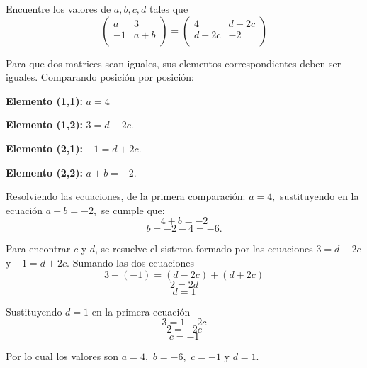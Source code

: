 \begin{prob} 
Encuentre los valores de $a,b,c,d$ tales que 
$$\left( \begin{array}{cc}
a&3\\
-1&a+b\\
\end{array} \right)=\left( \begin{array}{cc}
4&d-2c\\
d+2c&-2\\
\end{array} \right)$$

\begin{myproof}
Para que dos matrices sean iguales, sus elementos correspondientes deben ser iguales. Comparando posición por posición:

\textbf{Elemento (1,1):} $a = 4$

\textbf{Elemento (1,2):} $3 = d - 2c.$

\textbf{Elemento (2,1):} $-1 = d + 2c.$

\textbf{Elemento (2,2):} $a + b = -2.$

Resolviendo las ecuaciones, de la primera comparación: $a = 4,$ sustituyendo en la ecuación $a + b = -2,$ se cumple que:
$$4 + b = -2$$
$$b = -2 - 4 = -6.$$

Para encontrar $c$ y $d$, se resuelve el sistema formado por las ecuaciones $3 = d - 2c$ y $-1 = d + 2c.$ Sumando las dos ecuaciones
$$3 + (-1) = (d - 2c) + (d + 2c)$$
$$2 = 2d$$
$$d = 1$$

Sustituyendo $d = 1$ en la primera ecuación
$$3 = 1 - 2c$$
$$2 = -2c$$
$$c = -1$$

Por lo cual los valores son $a=4,$ $b=-6,$ $c=-1$ y $d=1.$
\end{myproof}
\end{prob}



